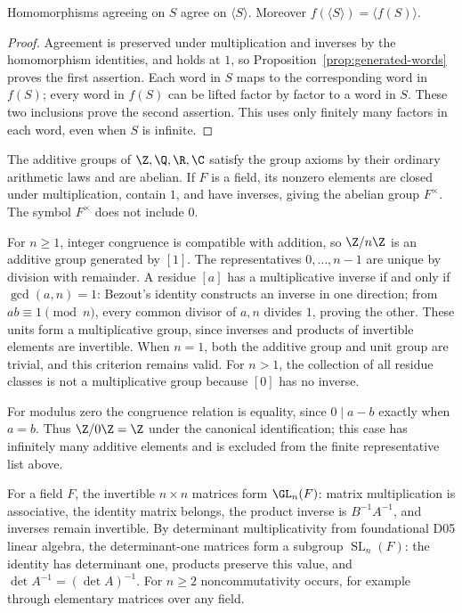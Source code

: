 \begin{proposition}\label{prop:hom-generators}
Homomorphisms agreeing on $S$ agree on $\langle S\rangle$. Moreover $f(\langle S\rangle)=\langle f(S)\rangle$.
\end{proposition}
\begin{proof}
Agreement is preserved under multiplication and inverses by the homomorphism identities, and holds at $1$, so Proposition~\ref{prop:generated-words} proves the first assertion. Each word in $S$ maps to the corresponding word in $f(S)$; every word in $f(S)$ can be lifted factor by factor to a word in $S$. These two inclusions prove the second assertion. This uses only finitely many factors in each word, even when $S$ is infinite.
\end{proof}

The additive groups of $\Z,\Q,\R,\C$ satisfy the group axioms by their ordinary arithmetic laws and are abelian. If $F$ is a field, its nonzero elements are closed under multiplication, contain $1$, and have inverses, giving the abelian group $F^\times$. The symbol $F^\times$ does not include $0$.

For $n\geq1$, integer congruence is compatible with addition, so $\Z/n\Z$ is an additive group generated by $[1]$. The representatives $0,\ldots,n-1$ are unique by division with remainder. A residue $[a]$ has a multiplicative inverse if and only if $\gcd(a,n)=1$: Bezout's identity constructs an inverse in one direction; from $ab\equiv1\pmod n$, every common divisor of $a,n$ divides $1$, proving the other. These units form a multiplicative group, since inverses and products of invertible elements are invertible. When $n=1$, both the additive group and unit group are trivial, and this criterion remains valid. For $n>1$, the collection of all residue classes is not a multiplicative group because $[0]$ has no inverse.

For modulus zero the congruence relation is equality, since $0\mid a-b$ exactly when $a=b$. Thus $\Z/0\Z=\Z$ under the canonical identification; this case has infinitely many additive elements and is excluded from the finite representative list above.

For a field $F$, the invertible $n\times n$ matrices form $\GL_n(F)$: matrix multiplication is associative, the identity matrix belongs, the product inverse is $B^{-1}A^{-1}$, and inverses remain invertible. By determinant multiplicativity from foundational D05 linear algebra, the determinant-one matrices form a subgroup $\operatorname{SL}_n(F)$: the identity has determinant one, products preserve this value, and $\det A^{-1}=(\det A)^{-1}$. For $n\geq2$ noncommutativity occurs, for example through elementary matrices over any field.

